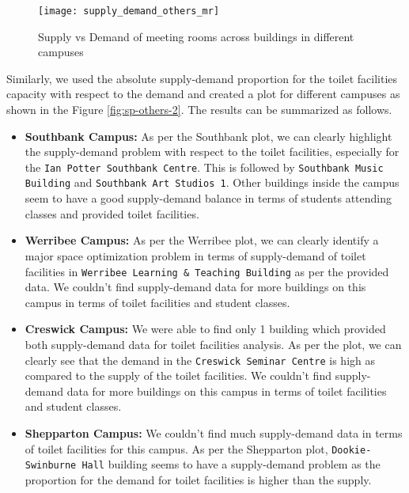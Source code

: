\begin{figure}[H]
\centering
\texttt{[image: supply\_demand\_others\_mr]}
\caption{Supply vs Demand of meeting rooms across buildings in different campuses}
\label{fig:sp-others-1}
\end{figure}

Similarly, we used the absolute supply-demand proportion for the toilet facilities capacity with respect to the demand and created a plot for different campuses as shown in the Figure \ref{fig:sp-others-2}. The results can be summarized as follows.

\begin{itemize}
    
    \item \textbf{Southbank Campus:} As per the Southbank plot, we can clearly highlight the supply-demand problem with respect to the toilet facilities, especially for the \texttt{Ian Potter Southbank Centre}. This is followed by \texttt{Southbank Music Building} and \texttt{Southbank Art Studios 1}. Other buildings inside the campus seem to have a good supply-demand balance in terms of students attending classes and provided toilet facilities.
    
    \item \textbf{Werribee Campus:} As per the Werribee plot, we can clearly identify a major space optimization problem in terms of supply-demand of toilet facilities in \texttt{Werribee Learning \& Teaching Building} as per the provided data. We couldn't find supply-demand data for more buildings on this campus in terms of toilet facilities and student classes.
    
    \item \textbf{Creswick Campus:} We were able to find only 1 building which provided both supply-demand data for toilet facilities analysis. As per the plot, we can clearly see that the demand in the \texttt{Creswick Seminar  Centre} is high as compared to the supply of the toilet facilities. We couldn't find supply-demand data for more buildings on this campus in terms of toilet facilities and student classes.
    
    \item \textbf{Shepparton Campus:} We couldn't find much supply-demand data in terms of toilet facilities for this campus. As per the Shepparton plot, \texttt{Dookie-Swinburne Hall} building seems to have a supply-demand problem as the proportion for the demand for toilet facilities is higher than the supply.
    

\end{itemize}
